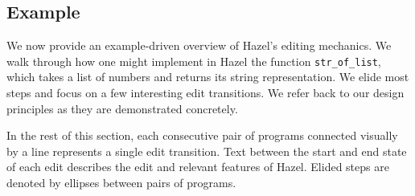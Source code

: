 \documentclass[runningheads]{llncs}
\newcommand{\Hazel}{\textsf{Hazel}\xspace}
\begin{document}
\subsection{Example}

We now provide an example-driven overview of \Hazel's editing mechanics.
We walk through how one might implement in \Hazel the function \texttt{str\_of\_list},
which takes a list of numbers and returns its string representation. We
elide most steps and focus on a few interesting edit transitions. We refer
back to our design principles as they are demonstrated concretely.

In the rest of this section, each consecutive pair of programs connected
visually by a line represents a single edit transition. Text between the
start and end state of each edit describes the edit and relevant features of
\Hazel. Elided steps are denoted by ellipses between pairs of programs.
\end{document}
